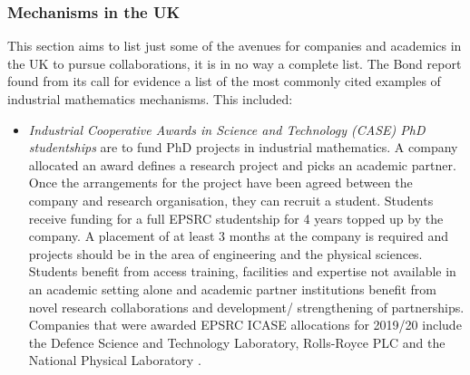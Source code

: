 \documentclass[11pt]{article} %
\begin{document}
	\subsubsection{ Mechanisms in the UK  }
	This section aims to list just some of the avenues for companies and academics in the UK to pursue collaborations, it is in no way a complete list. The Bond report \cite{Bond} found from its call for evidence a list of the most commonly cited examples of industrial mathematics mechanisms. This included: 
	\begin{itemize}
		\item \textit{Industrial Cooperative Awards in Science and Technology (CASE) PhD studentships } are to fund PhD projects in industrial mathematics.  A company allocated an award defines a research project and picks an academic partner. Once the arrangements for the project have been agreed between the company and research organisation, they can recruit a student. Students receive funding for a full EPSRC studentship for 4 years topped up by the company. A placement of at least 3 months at the company is required and projects should be in the area of engineering and the physical sciences. Students benefit from access training, facilities and expertise not available in an academic setting alone and academic partner institutions benefit from novel research collaborations and  development/ strengthening  of partnerships. 
		Companies that were awarded EPSRC ICASE allocations for 2019/20 include the Defence Science and Technology Laboratory, Rolls-Royce PLC and the National Physical Laboratory \cite{CASE}.  
		

\end{itemize}
\end{document}
